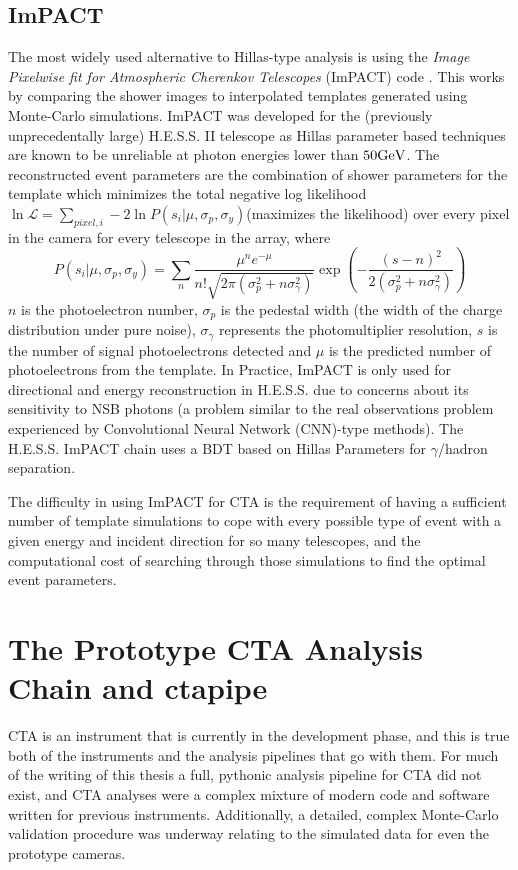 \subsection{ImPACT}
The most widely used alternative to Hillas-type analysis is using the \textit{Image Pixelwise fit for Atmospheric Cherenkov Telescopes} (ImPACT) code \cite{impact}. This works by comparing the shower images to interpolated templates generated using Monte-Carlo simulations. ImPACT was developed for the (previously unprecedentally large) H.E.S.S. II telescope as Hillas parameter based techniques are known to be unreliable at photon energies lower than $50\rm{Ge}V$.  The reconstructed event parameters are the combination of shower parameters for the template which minimizes the total negative log likelihood $\ln\mathcal{L}=\sum_{pixel,i}-2\ln{P(s_i|\mu,\sigma_p,\sigma_y)}$(maximizes the likelihood) over every pixel in the camera for every telescope in the array, where
\begin{equation}
P(s_i|\mu,\sigma_p,\sigma_y)=\sum_n \frac{\mu^n e^{-\mu}}{n!\sqrt{2\pi (\sigma_p^2+n\sigma_{\gamma}^2)}} \exp \left(-\frac{(s-n)^2}{2(\sigma_p^2 + n \sigma_{\gamma}^2)} \right)
\end{equation}
$n$ is the photoelectron number, $\sigma_p$ is the pedestal width (the width of the charge distribution under pure noise), $\sigma_{\gamma}$ represents the photomultiplier resolution, $s$ is the number of signal photoelectrons detected and $\mu$ is the predicted number of photoelectrons from the template. In Practice, ImPACT is only used for directional and energy reconstruction in H.E.S.S. due to concerns about its sensitivity to NSB photons (a problem similar to the real observations problem experienced by Convolutional Neural Network (CNN)-type methods). The H.E.S.S. ImPACT chain uses a BDT based on Hillas Parameters for $\gamma$/hadron separation.

The difficulty in using ImPACT for CTA is the requirement of having a sufficient number of template simulations to cope with every possible type of event with a given energy and incident direction for so many telescopes, and the computational cost of searching through those simulations to find the optimal event parameters.

\section{The Prototype CTA Analysis Chain and ctapipe}

CTA is an instrument that is currently in the development phase, and this is true both of the instruments and the analysis pipelines that go with them. For much of the writing of this thesis a full, pythonic analysis pipeline for CTA did not exist, and CTA analyses were a complex mixture of modern code and software written for previous instruments. Additionally, a detailed, complex Monte-Carlo validation procedure was underway relating to the simulated data for even the prototype cameras.

